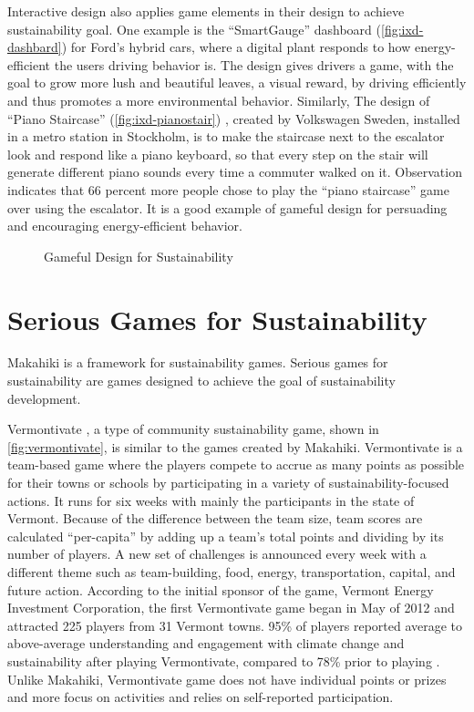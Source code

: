 Interactive design also applies game elements in their design to achieve sustainability goal. One example is the ``SmartGauge'' dashboard (\autoref{fig:ixd-dashbard}) \cite {ideo2009} for Ford's hybrid cars, where a digital plant responds to how energy-efficient the users driving behavior is. The design gives drivers a game, with the goal to grow more lush and beautiful leaves, a visual reward, by driving efficiently and thus promotes a more environmental behavior. Similarly, The design of ``Piano Staircase'' (\autoref{fig:ixd-pianostair}) \cite {funtheory2009}, created by Volkswagen Sweden, installed in a metro station in Stockholm, is to make the staircase next to the escalator look and respond like a piano keyboard, so that every step on the stair will generate different piano sounds every time a commuter walked on it. Observation indicates that 66 percent more people chose to play the ``piano staircase'' game over using the escalator. It is a good example of gameful design for persuading and encouraging energy-efficient behavior. 

 \begin{figure}[ht!]
	\centering
		\caption{Gameful Design for Sustainability}
		\label{fig:ixd}
\end{figure}	

\section{Serious Games for Sustainability}
\label{sec:rel-sg-sustainability}

Makahiki is a framework for sustainability games. Serious games for sustainability are games designed to achieve the goal of sustainability development.    

Vermontivate \cite{vermontivate}, a type of community sustainability game, shown in \autoref{fig:vermontivate}, is similar to the games created by Makahiki.  Vermontivate is a team-based game where  the players compete to accrue as many points as possible for their towns or schools by participating in a variety of sustainability-focused actions. It runs for six weeks with mainly the participants in the state of Vermont. Because of the difference between the team size, team scores are calculated ``per-capita'' by adding up a team's total points and dividing by its number of players. A new set of challenges is announced every week with a different theme such as team-building, food, energy, transportation, capital, and future action. According to the initial sponsor of the game, Vermont Energy Investment Corporation, the first Vermontivate game began in May of 2012 and attracted 225 players from 31 Vermont towns. 95\% of players reported average to above-average understanding and engagement with climate change and sustainability after playing Vermontivate, compared to 78\% prior to playing \cite{veic}. Unlike Makahiki, Vermontivate game does not have individual points or prizes and more focus on activities and relies on self-reported participation. 


